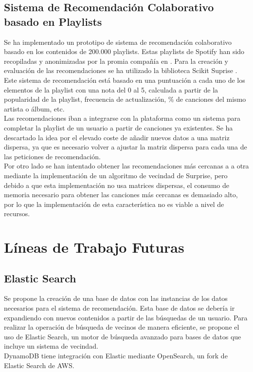\subsection{Sistema de Recomendación Colaborativo basado en Playlists}
Se ha implementado un prototipo de sistema de recomendación colaborativo basado en los contenidos de 200.000 playlists. Estas playlists de Spotify han sido recopiladas y anonimizadas por la promia compañía en \cite{million_playlist_dataset}. Para la creación y evaluación de las recomendaciones se ha utilizado la biblioteca Scikit Suprise \cite{supriselib}.\\
Este sistema de recomendación está basado en una puntuación a cada uno de los elementos de la playlist con una nota del 0 al 5, calculada a partir de la popularidad de la playlist, frecuencia de actualización, \% de canciones del mismo artista o álbum, etc.\\
Las recomendaciones iban a integrarse con la plataforma como un sistema para completar la playlist de un usuario a partir de canciones ya existentes. Se ha descartado la idea por el elevado coste de añadir nuevos datos a una matriz dispersa, ya que es necesario volver a ajustar la matriz dispersa para cada una de las peticiones de recomendación.\\
Por otro lado se han intentado obtener las recomendaciones más cercanas a a otra mediante la implementación de un algoritmo de vecindad de Surprise, pero debido a que esta implementación no usa matrices dispersas, el consumo de memoria necesario para obtener las canciones más cercanas es demasiado alto, por lo que la implementación de esta característica no es viable a nivel de recursos.


\section{Líneas de Trabajo Futuras}
\subsection{Elastic Search}
Se propone la creación de una base de datos con las instancias de los datos necesarios para el sistema de recomendación. Esta base de datos se debería ir expandiendo con nuevos contenidos a partir de las búsquedas de un usuario. 
Para realizar la operación de búsqueda de vecinos de manera eficiente, se propone el uso de Elastic Search\cite{elastic}, un motor de búsqueda avanzado para bases de datos que incluye un sistema de vecindad.\\
DynamoDB tiene integración con Elastic mediante OpenSearch, un fork de Elastic Search de AWS. 


